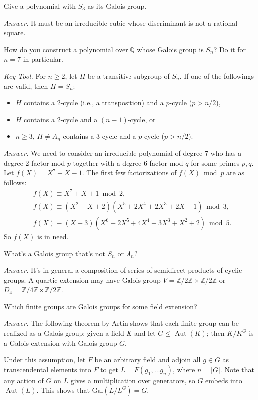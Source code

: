\documentclass{mathproblems}
\newcommand\Q{\mathbb{Q}}
\newcommand\Z{\mathbb{Z}}
\newcommand\Gal{\mathrm{Gal}}
\DeclareMathOperator{\Aut}{Aut}
\begin{document}
\begin{questions}
\miquestion
{\color{blue} Give a polynomial with $S_{3}$ as its Galois group.}

\textit{Answer.}
It must be an irreducible cubic whose discriminant is not a rational square.

\miquestion
{\color{blue} How do you construct a polynomial over $\Q$ whose Galois group is $S_{n}$? Do it for $n=7$ in particular.}

{\color{violet}
\textit{Key Tool.} For $n\geq 2$, let $H$ be a transitive subgroup of $S_n$. If one of the followings are valid, then $H=S_n$:
\begin{itemize}
    \item $H$ contains a 2-cycle (i.e., a transposition) and a $p$-cycle ($p>n/2$),
    \item $H$ contains a 2-cycle and a $(n-1)$-cycle, or
    \item $n\geq 3$, $H\neq A_n$ contains a 3-cycle and a $p$-cycle ($p>n/2$).
\end{itemize}
}

\textit{Answer.} We need to consider an irreducible polynomial of degree 7 who has a degree-2-factor mod $p$ together with a degree-6-factor mod $q$ for some primes $p,q$. Let $f(X)=X^{7}-X-1$. The first few factorizations of $f(X) \bmod p$ are as follows:
$$
\begin{aligned}
&f(X) \equiv X^{7}+X+1 \bmod 2, \\
&f(X) \equiv(X^{2}+X+2)(X^{5}+2 X^{4}+2 X^{3}+2 X+1) \bmod 3, \\
&f(X) \equiv(X+3)(X^{6}+2 X^{5}+4 X^{4}+3 X^{3}+X^{2}+2) \bmod 5.
\end{aligned}
$$
So $f(X)$ is in need.


\miquestion
{\color{blue} What's a Galois group that's not $S_{n}$ or $A_{n}$?}

\textit{Answer.} It's in general a composition of series of semidirect products of cyclic groups. A quartic extension may have Galois group $V=\Z/2\Z\times \Z/2\Z$ or $D_4= \Z/4\Z\rtimes \Z/2\Z$.

\miquestion
{\color{blue} Which finite groups are Galois groups for some field extension?}

\textit{Answer.} The following theorem by Artin shows that each finite group can be realized as a Galois group: given a field $K$ and let $G\leq \Aut(K)$; then $K/K^G$ is a Galois extension with Galois group $G$.

Under this assumption, let $F$ be an arbitrary field and adjoin all $g\in G$ as transcendental elements into $F$ to get $L=F(g_1,\ldots g_n)$, where $n=|G|$. Note that any action of $G$ on $L$ gives a multiplication over generators, so $G$ embeds into $\Aut(L)$. This shows that $\Gal(L/L^G)=G$.


\end{questions}
\end{document}
